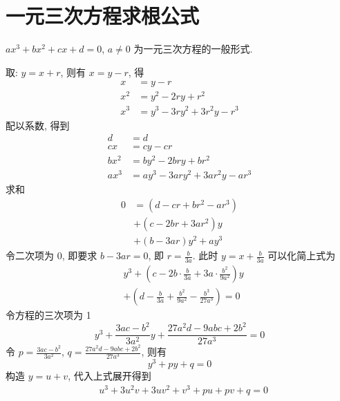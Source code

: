 \section{一元三次方程求根公式}
\begin{defination}
$ax^3 + bx^2 + cx + d = 0$, $a \ne 0$ 为一元三次方程的一般形式.
\end{defination}
\begin{solution}
取: $y = x + r$, 则有 $x = y - r$, 得
\[ \begin{aligned}
x &= y - r \\
x^2 &= y^2 - 2ry + r^2 \\
x^3 &= y^3 - 3ry^2 + 3r^2y - r^3
\end{aligned} \]
配以系数, 得到
\[ \begin{aligned}
d &= d \\
cx &= cy - cr \\
bx^2 &= by^2 - 2bry + br^2 \\
ax^3 &= ay^3 - 3ary^2 + 3ar^2y - ar^3
\end{aligned} \]
求和
\[ \begin{aligned}
0 &= (d - cr + br^2 - ar^3) \\
    &+ (c - 2br + 3ar^2) y \\
    &+ (b - 3ar) y^2 + ay^3
\end{aligned} \]
令二次项为 0, 即要求 $b - 3ar = 0$, 即 $r = \frac{b}{3a}$. 此时
$y = x + \frac{b}{3a}$ 可以化简上式为
\[ \begin{aligned}
&y^3 + (c - 2b \cdot \frac{b}{3a} + 3a \cdot \frac{b^2}{9a^2}) y \\
&+ (d - \frac{b}{3a} + \frac{b^2}{9a^2} - \frac{b^3}{27a^3}) = 0
\end{aligned} \]
令方程的三次项为 1
\[ y^3 + \frac{3ac-b^2}{3a^2} y + \frac{27a^2d - 9abc + 2b^2}{27a^3} = 0 \]
令 $p = \frac{3ac-b^2}{3a^2}$, $q = \frac{27a^2d - 9abc + 2b^2}{27a^3}$, 则有
\[ y^3 + p y + q = 0 \]
构造 $y = u + v$, 代入上式展开得到
\[ \begin{aligned}
& u^3 + 3u^2v + 3uv^2 + v^3 + pu + pv + q = 0 \\

\end{aligned}\]
\end{solution}
